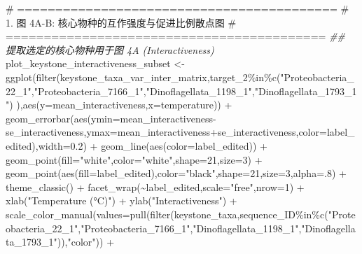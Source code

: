 \documentclass[
  letterpaper,
  DIV=11,
  numbers=noendperiod]{scrreprt}
\newenvironment{Shaded}{\begin{snugshade}}{\end{snugshade}}
\newcommand{\AttributeTok}[1]{\textcolor[rgb]{0.40,0.45,0.13}{#1}}
\newcommand{\CommentTok}[1]{\textcolor[rgb]{0.37,0.37,0.37}{#1}}
\newcommand{\DecValTok}[1]{\textcolor[rgb]{0.68,0.00,0.00}{#1}}
\newcommand{\DocumentationTok}[1]{\textcolor[rgb]{0.37,0.37,0.37}{\textit{#1}}}
\newcommand{\FloatTok}[1]{\textcolor[rgb]{0.68,0.00,0.00}{#1}}
\newcommand{\FunctionTok}[1]{\textcolor[rgb]{0.28,0.35,0.67}{#1}}
\newcommand{\NormalTok}[1]{\textcolor[rgb]{0.00,0.23,0.31}{#1}}
\newcommand{\OtherTok}[1]{\textcolor[rgb]{0.00,0.23,0.31}{#1}}
\newcommand{\SpecialCharTok}[1]{\textcolor[rgb]{0.37,0.37,0.37}{#1}}
\newcommand{\StringTok}[1]{\textcolor[rgb]{0.13,0.47,0.30}{#1}}
\begin{document}
\begin{Shaded}
\begin{Highlighting}[]
\CommentTok{\# ==========================================}
\CommentTok{\# 1. 图 4A{-}B: 核心物种的互作强度与促进比例散点图}
\CommentTok{\# ==========================================}
\DocumentationTok{\#\# 提取选定的核心物种用于图 4A (Interactiveness)}
\NormalTok{plot\_keystone\_interactiveness\_subset }\OtherTok{\textless{}{-}} \FunctionTok{ggplot}\NormalTok{(}\FunctionTok{filter}\NormalTok{(keystone\_taxa\_var\_inter\_matrix,target\_2}\SpecialCharTok{\%in\%}\FunctionTok{c}\NormalTok{(}\StringTok{"Proteobacteria\_22\_1"}\NormalTok{,}\StringTok{"Proteobacteria\_7166\_1"}\NormalTok{,}\StringTok{"Dinoflagellata\_1198\_1"}\NormalTok{,}\StringTok{"Dinoflagellata\_1793\_1"}\NormalTok{) ),}\FunctionTok{aes}\NormalTok{(}\AttributeTok{y=}\NormalTok{mean\_interactiveness,}\AttributeTok{x=}\NormalTok{temperature)) }\SpecialCharTok{+}
  \FunctionTok{geom\_errorbar}\NormalTok{(}\FunctionTok{aes}\NormalTok{(}\AttributeTok{ymin=}\NormalTok{mean\_interactiveness}\SpecialCharTok{{-}}\NormalTok{se\_interactiveness,}\AttributeTok{ymax=}\NormalTok{mean\_interactiveness}\SpecialCharTok{+}\NormalTok{se\_interactiveness,}\AttributeTok{color=}\NormalTok{label\_edited),}\AttributeTok{width=}\FloatTok{0.2}\NormalTok{) }\SpecialCharTok{+}
  \FunctionTok{geom\_line}\NormalTok{(}\FunctionTok{aes}\NormalTok{(}\AttributeTok{color=}\NormalTok{label\_edited)) }\SpecialCharTok{+}
  \FunctionTok{geom\_point}\NormalTok{(}\AttributeTok{fill=}\StringTok{"white"}\NormalTok{,}\AttributeTok{color=}\StringTok{"white"}\NormalTok{,}\AttributeTok{shape=}\DecValTok{21}\NormalTok{,}\AttributeTok{size=}\DecValTok{3}\NormalTok{) }\SpecialCharTok{+}
  \FunctionTok{geom\_point}\NormalTok{(}\FunctionTok{aes}\NormalTok{(}\AttributeTok{fill=}\NormalTok{label\_edited),}\AttributeTok{color=}\StringTok{"black"}\NormalTok{,}\AttributeTok{shape=}\DecValTok{21}\NormalTok{,}\AttributeTok{size=}\DecValTok{3}\NormalTok{,}\AttributeTok{alpha=}\NormalTok{.}\DecValTok{8}\NormalTok{) }\SpecialCharTok{+}
  \FunctionTok{theme\_classic}\NormalTok{() }\SpecialCharTok{+}
  \FunctionTok{facet\_wrap}\NormalTok{(}\SpecialCharTok{\textasciitilde{}}\NormalTok{label\_edited,}\AttributeTok{scale=}\StringTok{"free"}\NormalTok{,}\AttributeTok{nrow=}\DecValTok{1}\NormalTok{) }\SpecialCharTok{+}
  \FunctionTok{xlab}\NormalTok{(}\StringTok{"Temperature (°C)"}\NormalTok{) }\SpecialCharTok{+}
  \FunctionTok{ylab}\NormalTok{(}\StringTok{"Interactiveness"}\NormalTok{) }\SpecialCharTok{+}
  \FunctionTok{scale\_color\_manual}\NormalTok{(}\AttributeTok{values=}\FunctionTok{pull}\NormalTok{(}\FunctionTok{filter}\NormalTok{(keystone\_taxa,sequence\_ID}\SpecialCharTok{\%in\%}\FunctionTok{c}\NormalTok{(}\StringTok{"Proteobacteria\_22\_1"}\NormalTok{,}\StringTok{"Proteobacteria\_7166\_1"}\NormalTok{,}\StringTok{"Dinoflagellata\_1198\_1"}\NormalTok{,}\StringTok{"Dinoflagellata\_1793\_1"}\NormalTok{)),}\StringTok{"color"}\NormalTok{)) }\SpecialCharTok{+}

\end{Highlighting}
\end{Shaded}
\end{document}
